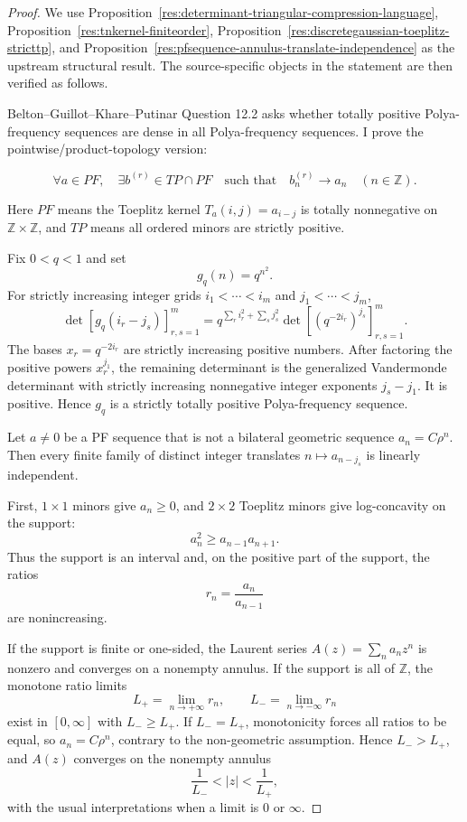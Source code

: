 \documentclass[11pt]{article}
\numberwithin{equation}{section}
\theoremstyle{definition}
\theoremstyle{remark}
\newcommand{\1}{\mathbf 1}
\begin{document}
\begin{proof}
We use Proposition~\ref{res:determinant-triangular-compression-language}, Proposition~\ref{res:tnkernel-finiteorder}, Proposition~\ref{res:discretegaussian-toeplitz-stricttp}, and Proposition~\ref{res:pfsequence-annulus-translate-independence} as the upstream structural result. The source-specific objects in the statement are then verified as follows.

Belton--Guillot--Khare--Putinar Question 12.2 asks whether totally positive Polya-frequency sequences are dense in all Polya-frequency sequences. I prove the pointwise/product-topology version:

\[
\forall a\in PF,\quad \exists b^{(r)}\in TP\cap PF
\quad\text{such that}\quad b^{(r)}_n\to a_n\quad(n\in\mathbb Z).
\]

Here \(PF\) means the Toeplitz kernel \(T_a(i,j)=a_{i-j}\) is totally nonnegative on \(\mathbb Z\times\mathbb Z\), and \(TP\) means all ordered minors are strictly positive.

Fix \(0<q<1\) and set
\[
g_q(n)=q^{n^2}.
\]
For strictly increasing integer grids \(i_1<\cdots<i_m\) and \(j_1<\cdots<j_m\),
\[
\det[g_q(i_r-j_s)]_{r,s=1}^m
=
q^{\sum_r i_r^2+\sum_s j_s^2}
\det[(q^{-2i_r})^{j_s}]_{r,s=1}^m .
\]
The bases \(x_r=q^{-2i_r}\) are strictly increasing positive numbers. After factoring the positive powers \(x_r^{j_1}\), the remaining determinant is the generalized Vandermonde determinant with strictly increasing nonnegative integer exponents \(j_s-j_1\). It is positive. Hence \(g_q\) is a strictly totally positive Polya-frequency sequence.

Let \(a\neq0\) be a PF sequence that is not a bilateral geometric sequence \(a_n=C\rho^n\). Then every finite family of distinct integer translates \(n\mapsto a_{n-j_s}\) is linearly independent.

First, \(1\times1\) minors give \(a_n\ge0\), and \(2\times2\) Toeplitz minors give log-concavity on the support:
\[
a_n^2\ge a_{n-1}a_{n+1}.
\]
Thus the support is an interval and, on the positive part of the support, the ratios
\[
r_n=\frac{a_n}{a_{n-1}}
\]
are nonincreasing.

If the support is finite or one-sided, the Laurent series \(A(z)=\sum_n a_nz^n\) is nonzero and converges on a nonempty annulus. If the support is all of \(\mathbb Z\), the monotone ratio limits
\[
L_+=\lim_{n\to+\infty}r_n,\qquad L_-=\lim_{n\to-\infty}r_n
\]
exist in \([0,\infty]\) with \(L_-\ge L_+\). If \(L_-=L_+\), monotonicity forces all ratios to be equal, so \(a_n=C\rho^n\), contrary to the non-geometric assumption. Hence \(L_->L_+\), and \(A(z)\) converges on the nonempty annulus
\[
\frac1{L_-}<|z|<\frac1{L_+},
\]
with the usual interpretations when a limit is \(0\) or \(\infty\).


\end{proof}
\end{document}
